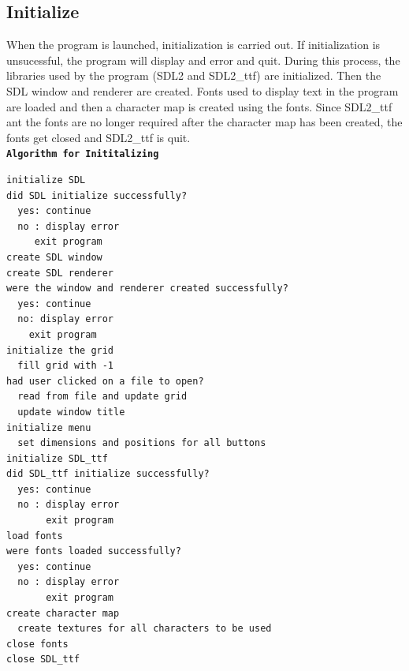 \documentclass[report]{subfiles}
\begin{document}
    \subsection{Initialize}
    When the program is launched, initialization is carried out. If initialization is unsucessful, the program will display and error and quit. During this process, the libraries used by the program (SDL2 and SDL2\_ttf) are initialized. Then the SDL window and renderer are created. Fonts used to display text in the program are loaded and then a character map is created using the fonts. Since SDL2\_ttf ant the fonts are no longer required after the character map has been created, the fonts get closed and SDL2\_ttf is quit.\\
        \textbf{\texttt{Algorithm for Inititalizing}}
        \begin{verbatim}
initialize SDL
did SDL initialize successfully?
  yes: continue
  no : display error
     exit program
create SDL window
create SDL renderer
were the window and renderer created successfully?
  yes: continue
  no: display error
    exit program
initialize the grid
  fill grid with -1
had user clicked on a file to open?
  read from file and update grid
  update window title
initialize menu
  set dimensions and positions for all buttons
initialize SDL_ttf
did SDL_ttf initialize successfully?
  yes: continue
  no : display error
       exit program
load fonts
were fonts loaded successfully?
  yes: continue
  no : display error
       exit program
create character map
  create textures for all characters to be used
close fonts
close SDL_ttf
        \end{verbatim}
\end{document}
